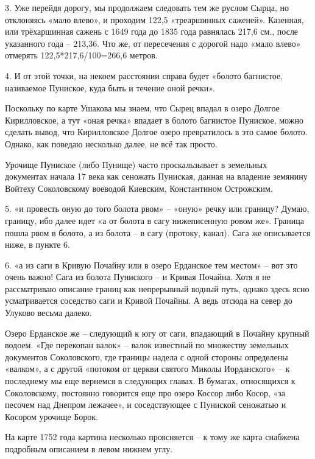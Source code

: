 3. Уже перейдя дорогу, мы продолжаем следовать тем же руслом Сырца, но отклоняясь «мало влево», и проходим 122,5 «треаршинных саженей». Казенная, или трёхаршинная сажень с 1649 года до 1835 года равнялась 217,6 см., после указанного года – 213,36. Что же, от пересечения с дорогой надо «мало влево» отмерять 122,5*217,6/100=266,6 метров.

4. И от этой точки, на некоем расстоянии справа будет «болото багнистое, називаемое Пуниское, куда быть и течение оной речки».

Поскольку по карте Ушакова мы знаем, что Сырец впадал в озеро Долгое Кирилловское, а тут «оная речка» впадает в болото багнистое Пуниское, можно сделать вывод, что Кирилловское Долгое озеро превратилось в это самое болото. Однако, как поведаю несколько далее, не всё так просто.

Урочище Пуниское (либо Пунище) часто проскальзывает в земельных документах начала 17 века как сеножать Пуниская, данная на владение земянину Войтеху Соколовскому воеводой Киевским, Константином Острожским.

5. «и провесть оную до того болота рвом» – «оную» речку или границу? Думаю, границу, ибо далее идет «а от болота в сагу нижеписенную ровом же». Граница пошла рвом в болото, а из болота – в сагу (протоку, канал). Сага же описывается ниже, в пункте 6.

6. «а из саги в Кривую Почайну или в озеро Ерданское тем местом» – вот это очень важно! Сага из болота Пуниского – и Кривая Почайна. Хотя я не рассматриваю описание границ как непрерывный водный путь, однако здесь ясно усматривается соседство саги и Кривой Почайны. А ведь отсюда на север до Улуково весьма далеко.

Озеро Ерданское же – следующий к югу от саги, впадающий в Почайну крупный водоем. «Где перекопан валок» – валок известный по множеству земельных документов Соколовского, где границы надела с одной стороны определены «валком», а с другой «потоком от церкви святого Миколы Иорданского» – к последнему мы еще вернемся в следующих главах. В бумагах, относящихся к Соколовскому, постоянно говорится еще про озеро Коссор либо Косор, «за песочем над Днепром лежачее», и соседствующее с Пуниской сеножатью и Косором урочище Борок.

На карте 1752 года картина несколько проясняется – к тому же карта снабжена подробным описанием в левом нижнем углу.

